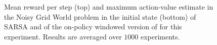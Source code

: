\documentclass[conference]{IEEEtran}
\begin{document}
\begin{figure}[t]
\begin{minipage}{\columnwidth}
\centering
  \hspace{-.5cm}
\end{minipage}
  \caption{Mean reward per step (top) and maximum action-value estimate in the Noisy Grid World problem in the initial state (bottom) of SARSA and of the on-policy windowed version of \alg for this experiment. Results are averaged over $1000$ experiments.}
  \label{F:sarsa}
\end{figure}
\end{document}
